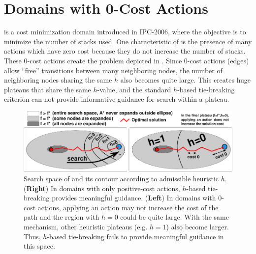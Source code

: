 \section{Domains with 0-Cost Actions}
\label{sec:zerocost-domains}
  is a cost
minimization domain introduced in IPC-2006, where the objective is to 
minimize the number of stacks used.
One characteristic of  is the presence of many  actions which have zero cost because they do not increase the number of stacks. These 0-cost actions create the problem depicted in .
Since 0-cost actions (edges) allow ``free'' transitions between many neighboring nodes,
the number of neighboring nodes sharing the same $h$ also becomes quite large.
This creates huge plateaus that share the same $h$-value, and the standard $h$-based tie-breaking criterion can not provide informative guidance for search within a plateau.

\begin{figure}[htbp]
  \centering
  \includegraphics{img/astar/plateau-1.pdf}
 \caption{Search space of \astar and its contour according to admissible heuristic $h$. (\textbf{Right}) In domains with only positive-cost actions, $h$-based tie-breaking provides meaningful guidance. (\textbf{Left}) In domains with 0-cost actions, applying an action may not increase the cost of the path and the region with $h=0$ could be quite large. With the same mechanism, other heuristic plateaus (e.g. $h=1$) also become larger. Thus, $h$-based tie-breaking fails to provide meaningful guidance in this space.
  }
 \label{fig:plateau-1}
\end{figure}



